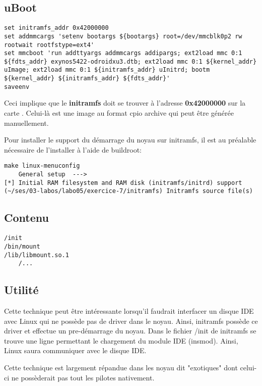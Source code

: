 \href{http://forum.odroid.com/viewtopic.php?f=81&t=4860}{}

\subsection{uBoot}
\begin{lstlisting}
set initramfs_addr 0x42000000
set addmmcargs 'setenv bootargs ${bootargs} root=/dev/mmcblk0p2 rw rootwait rootfstype=ext4'
set mmcboot 'run addttyargs addmmcargs addipargs; ext2load mmc 0:1 ${fdts_addr} exynos5422-odroidxu3.dtb; ext2load mmc 0:1 ${kernel_addr} uImage; ext2load mmc 0:1 ${initramfs_addr} uInitrd; bootm ${kernel_addr} ${initramfs_addr} ${fdts_addr}'
saveenv
\end{lstlisting}
Ceci implique que le \textbf{initramfs} doit se trouver à l'adresse \textbf{0x42000000} sur la carte \usd. Celui-là est une image au format cpio archive qui peut être générée manuellement.

Pour installer le support du démarrage du noyau sur initramfs, il est au préalable nécessaire de l'installer à l'aide de buildroot:
\begin{lstlisting}[style=Bash]
make linux-menuconfig
    General setup  --->
[*] Initial RAM filesystem and RAM disk (initramfs/initrd) support
(~/ses/03-labos/labo05/exercice-7/initramfs) Initramfs source file(s)
\end{lstlisting}

\subsection{Contenu}
\begin{lstlisting}
/init
/bin/mount
/lib/libmount.so.1
	/...
\end{lstlisting}

\subsection{Utilité}
Cette technique peut être intéressante lorsqu'il faudrait interfacer un disque IDE avec Linux qui ne possède pas de driver dans le noyau. Ainsi, initramfs possède ce driver et effectue un pre-démarrage du noyau. Dans le fichier /init de initramfs se trouve une ligne permettant le chargement du module IDE (insmod). Ainsi, Linux saura communiquer avec le disque IDE.

Cette technique est largement répandue dans les noyau dit "exotiques" dont celui-ci ne possèderait pas tout les pilotes nativement.

